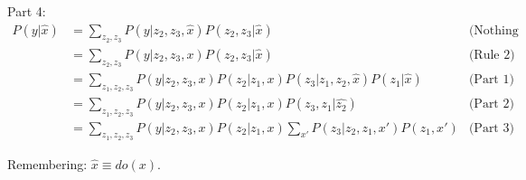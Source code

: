 Part 4:
\begin{align*}
P(y|\hat{x})&=\sum\limits_{z_2,z_3}P(y|z_2,z_3,\hat{x})P(z_2,z_3|\hat{x})&\text{(Nothing special here)}\\
&=\sum\limits_{z_2,z_3}P(y|z_2,z_3,x)P(z_2,z_3|\hat{x})&\text{(Rule 2)}\\
&=\sum\limits_{z_1,z_2,z_3}P(y|z_2,z_3,x)P(z_2|z_1,x)P(z_3|z_1,z_2,\hat{x})P(z_1|\hat{x})&\text{(Part 1)}\\
&=\sum\limits_{z_1,z_2,z_3}P(y|z_2,z_3,x)P(z_2|z_1,x)P(z_3,z_1|\hat{z_2})&\text{(Part 2)}\\
&=\sum\limits_{z_1,z_2,z_3}P(y|z_2,z_3,x)P(z_2|z_1,x)\sum\limits_{x'}P(z_3|z_2,z_1,x')P(z_1,x')&\text{(Part 3)}
\end{align*}

Remembering: $\hat{x} \equiv do(x)$.
